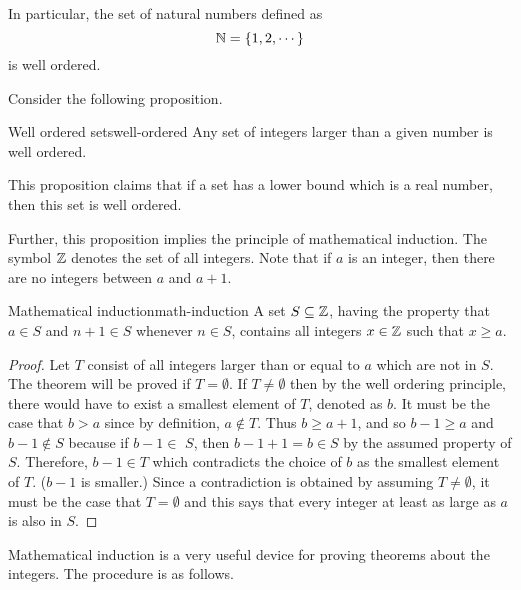 In particular, the set of natural numbers defined as
\begin{equation*}
\mathbb{N} = \left\{1,2,\cdots \right\}
\end{equation*}
is well ordered.

Consider the following proposition.

\begin{proposition}{Well ordered sets}{well-ordered}
Any set of integers larger than a given number is well ordered.
\end{proposition}

This proposition claims that if a set has a lower bound which is a real number, 
then this set is well ordered.

Further, this proposition implies the principle of mathematical induction. The symbol $\mathbb{Z}$ denotes the set of all
integers. Note that if $a$ is an integer, then there are no integers between
$a$ and $a+1$.

\begin{theorem}{Mathematical induction}{math-induction}
 A set $S\subseteq \mathbb{Z}$, having
the property that $a\in S$ and $n+1\in S$ whenever $n\in S$, contains all
integers $x\in \mathbb{Z}$ such that $x\geq a$.
\end{theorem}

\begin{proof} 
Let $T$ consist of all integers larger than or equal to $a$
which are not in $S$. The theorem will be proved if $T=\emptyset$. If 
$T\neq \emptyset $ then by the well ordering principle, there would have to
exist a smallest element of $T$, denoted as $b$. It must be the case that 
$b>a$ since by definition, $a\notin T$. Thus $b\geq a+1$, and so $b-1\geq a$
and $b-1\notin S$ because if $b-1\in $ $S$, then $b-1+1=b\in S$ by the
assumed property of $S$. Therefore, $b-1\in T$ which contradicts the choice
of $b$ as the smallest element of $T$. ($b-1$ is smaller.) Since a
contradiction is obtained by assuming $T\neq \emptyset$, it must be the
case that $T=\emptyset $ and this says that every integer at least as large
as $a$ is also in $S$.
\end{proof}

Mathematical induction is a very useful device for proving theorems about
the integers. The procedure is as follows.

